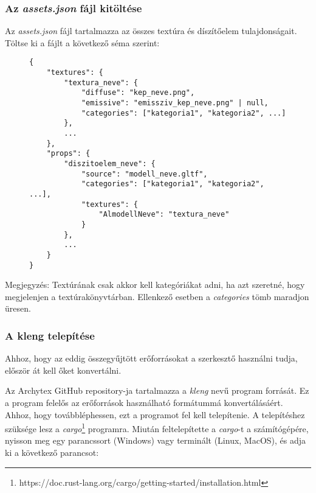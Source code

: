 \pagebreak

\subsubsection{Az \emph{assets.json} fájl kitöltése}

Az \emph{assets.json} fájl tartalmazza az összes textúra és díszítőelem tulajdonságait. Töltse ki
a fájlt a következő séma szerint:

\begin{figure}[h]
\centering
\begin{minipage}{.7\textwidth}
\centering
\begin{lstlisting}
{
    "textures": {
        "textura_neve": {
            "diffuse": "kep_neve.png",
            "emissive": "emissziv_kep_neve.png" | null,
            "categories": ["kategoria1", "kategoria2", ...]
        },
        ...
    },
    "props": {
        "diszitoelem_neve": {
            "source": "modell_neve.gltf",
            "categories": ["kategoria1", "kategoria2", ...],
            "textures": {
                "AlmodellNeve": "textura_neve"
            }
        },
        ...
    }
}
\end{lstlisting}
\end{minipage}
\end{figure}

Megjegyzés: Textúrának csak akkor kell kategóriákat adni, ha azt szeretné, hogy megjelenjen a
textúrakönyvtárban. Ellenkező esetben a \emph{categories} tömb maradjon üresen.

\pagebreak

\subsubsection{A kleng telepítése}

Ahhoz, hogy az eddig összegyűjtött erőforrásokat a szerkesztő használni tudja, először át kell őket
konvertálni.

Az Archytex GitHub repository-ja tartalmazza a \emph{kleng} nevű program forrását. Ez a program
felelős az erőforrások használható formátummá konvertálásáért. Ahhoz, hogy továbbléphessen, ezt a
programot fel kell telepítenie. A telepítéshez szüksége lesz a
\emph{cargo}\footnote{https://doc.rust-lang.org/cargo/getting-started/installation.html}
programra. Miután feltelepítette a \emph{cargo}-t a számítógépére, nyisson meg egy parancssort
(Windows) vagy terminált (Linux, MacOS), és adja ki a következő parancsot:

